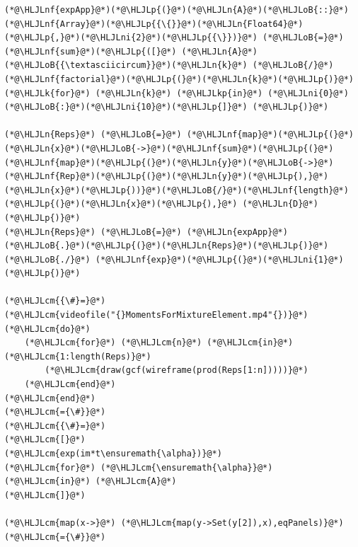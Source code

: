 \documentclass[12pt,a4paper]{article}
\newcommand{\HLJLk}[1]{\textcolor[RGB]{148,91,176}{\textbf{#1}}}
\newcommand{\HLJLkp}[1]{\textcolor[RGB]{148,91,176}{\textbf{#1}}}
\newcommand{\HLJLn}[1]{#1}
\newcommand{\HLJLnf}[1]{\textcolor[RGB]{66,102,213}{#1}}
\newcommand{\HLJLni}[1]{\textcolor[RGB]{59,151,46}{#1}}
\newcommand{\HLJLoB}[1]{\textcolor[RGB]{102,102,102}{\textbf{#1}}}
\newcommand{\HLJLp}[1]{#1}
\newcommand{\HLJLcm}[1]{\textcolor[RGB]{153,153,119}{\textit{#1}}}
\begin{document}
\begin{lstlisting}
(*@\HLJLnf{expApp}@*)(*@\HLJLp{(}@*)(*@\HLJLn{A}@*)(*@\HLJLoB{::}@*)(*@\HLJLnf{Array}@*)(*@\HLJLp{{\{}}@*)(*@\HLJLn{Float64}@*)(*@\HLJLp{,}@*)(*@\HLJLni{2}@*)(*@\HLJLp{{\}})}@*) (*@\HLJLoB{=}@*) (*@\HLJLnf{sum}@*)(*@\HLJLp{([}@*) (*@\HLJLn{A}@*)(*@\HLJLoB{{\textasciicircum}}@*)(*@\HLJLn{k}@*) (*@\HLJLoB{/}@*) (*@\HLJLnf{factorial}@*)(*@\HLJLp{(}@*)(*@\HLJLn{k}@*)(*@\HLJLp{)}@*) (*@\HLJLk{for}@*) (*@\HLJLn{k}@*) (*@\HLJLkp{in}@*) (*@\HLJLni{0}@*)(*@\HLJLoB{:}@*)(*@\HLJLni{10}@*)(*@\HLJLp{]}@*) (*@\HLJLp{)}@*)

(*@\HLJLn{Reps}@*) (*@\HLJLoB{=}@*) (*@\HLJLnf{map}@*)(*@\HLJLp{(}@*)(*@\HLJLn{x}@*)(*@\HLJLoB{->}@*)(*@\HLJLnf{sum}@*)(*@\HLJLp{(}@*)(*@\HLJLnf{map}@*)(*@\HLJLp{(}@*)(*@\HLJLn{y}@*)(*@\HLJLoB{->}@*)(*@\HLJLnf{Rep}@*)(*@\HLJLp{(}@*)(*@\HLJLn{y}@*)(*@\HLJLp{),}@*)(*@\HLJLn{x}@*)(*@\HLJLp{))}@*)(*@\HLJLoB{/}@*)(*@\HLJLnf{length}@*)(*@\HLJLp{(}@*)(*@\HLJLn{x}@*)(*@\HLJLp{),}@*) (*@\HLJLn{D}@*)(*@\HLJLp{)}@*)
(*@\HLJLn{Reps}@*) (*@\HLJLoB{=}@*) (*@\HLJLn{expApp}@*)(*@\HLJLoB{.}@*)(*@\HLJLp{(}@*)(*@\HLJLn{Reps}@*)(*@\HLJLp{)}@*) (*@\HLJLoB{./}@*) (*@\HLJLnf{exp}@*)(*@\HLJLp{(}@*)(*@\HLJLni{1}@*)(*@\HLJLp{)}@*)

(*@\HLJLcm{{\#}=}@*)
(*@\HLJLcm{videofile("{}MomentsForMixtureElement.mp4"{})}@*) (*@\HLJLcm{do}@*)
	(*@\HLJLcm{for}@*) (*@\HLJLcm{n}@*) (*@\HLJLcm{in}@*) (*@\HLJLcm{1:length(Reps)}@*)
		(*@\HLJLcm{draw(gcf(wireframe(prod(Reps[1:n]))))}@*)
	(*@\HLJLcm{end}@*)
(*@\HLJLcm{end}@*)
(*@\HLJLcm{={\#}}@*)
(*@\HLJLcm{{\#}=}@*)
(*@\HLJLcm{[}@*)
(*@\HLJLcm{exp(im*t\ensuremath{\alpha})}@*)
(*@\HLJLcm{for}@*) (*@\HLJLcm{\ensuremath{\alpha}}@*) (*@\HLJLcm{in}@*) (*@\HLJLcm{A}@*)
(*@\HLJLcm{]}@*)

(*@\HLJLcm{map(x->}@*) (*@\HLJLcm{map(y->Set(y[2]),x),eqPanels)}@*)
(*@\HLJLcm{={\#}}@*)
\end{lstlisting}
\end{document}
